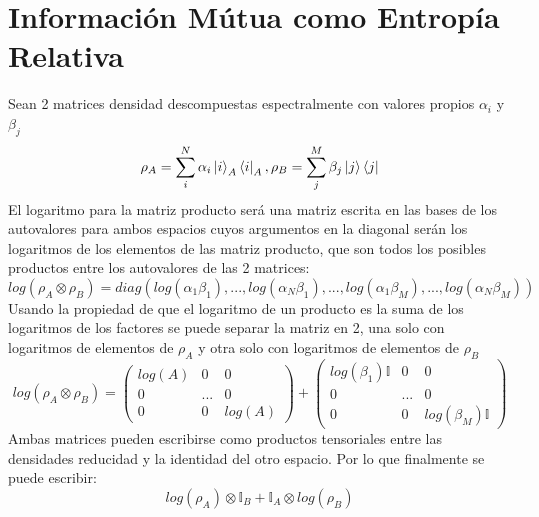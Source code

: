 \documentclass{book}
\begin{document}
\section{{Información Mútua como Entropía Relativa}}
    Sean 2 matrices densidad descompuestas espectralmente con valores propios $\alpha_i$ y $\beta_j$
    \begin{equation}\label{eq8.34}{\rho_A=\sum_i^N \alpha_i\ket{i}_A\bra{i}_A, \rho_B=\sum_j^M\beta_j\ket{j}\bra{j}}\end{equation}
    El logaritmo para la matriz producto será una matriz escrita en las bases de los autovalores para ambos espacios cuyos argumentos en la diagonal serán los logaritmos de los elementos de las matriz producto, que son todos los posibles productos entre los autovalores de las 2 matrices:
    \begin{equation}\label{eq8.35}{log(\rho_A\otimes\rho_B)=diag(log(\alpha_1\beta_1),...,log(\alpha_N\beta_1),...,log(\alpha_1\beta_M),...,log(\alpha_N\beta_M))}\end{equation}
    Usando la propiedad de que el logaritmo de un producto es la suma de los logaritmos de los factores se puede separar la matriz en 2, una solo con logaritmos de elementos de $\rho_A$ y otra solo con logaritmos de elementos de $\rho_B$
    \begin{equation}\label{eq8.36}{ log(\rho_A\otimes\rho_B)=\begin{pmatrix}log(A)&0&0\\0&...&0\\0&0&log(A)\end{pmatrix}+\begin{pmatrix}log(\beta_1)\mathbb{I}&0&0\\ 0&...&0 \\0&0&log(\beta_M)\mathbb{I}\end{pmatrix}}\end{equation}
    Ambas matrices pueden escribirse como productos tensoriales entre las densidades reducidad y la identidad del otro espacio. Por lo que finalmente se puede escribir:
    \begin{equation}\label{eq8.37}{log(\rho_A)\otimes\mathbb{I}_B+\mathbb{I}_A\otimes log(\rho_B)}\end{equation}
\end{document}
